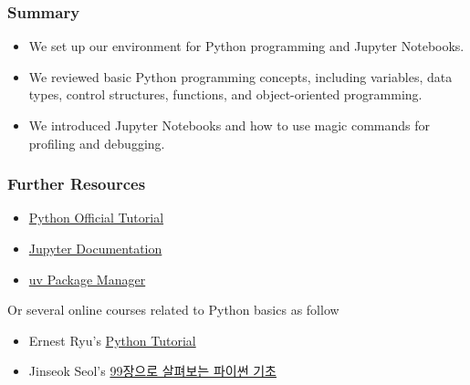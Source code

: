 \begin{frame}
    \frametitle{Summary}

    \begin{itemize}
        \item We set up our environment for Python programming and Jupyter Notebooks.
        \item We reviewed basic Python programming concepts, including variables, data types, control structures, functions, and object-oriented programming.
        \item We introduced Jupyter Notebooks and how to use magic commands for profiling and debugging.
    \end{itemize}
\end{frame}

\begin{frame}
    \frametitle{Further Resources}

    \begin{itemize}
        \item \href{https://docs.python.org/3/tutorial/}{Python Official Tutorial}
        \item \href{https://jupyter.org/documentation}{Jupyter Documentation}
        \item \href{https://astral.sh/uv/}{uv Package Manager}
    \end{itemize}

    Or several online courses related to Python basics as follow
    \begin{itemize}
        \item Ernest Ryu's \href{https://www.youtube.com/watch?v=vSoHnfhBryg}{Python Tutorial}
        \item Jinseok Seol's \href{https://youtu.be/wiDn1xt2_EU?si=H5NMBM0_wIVWRvcN}{99장으로 살펴보는 파이썬 기초}
    \end{itemize}
\end{frame}